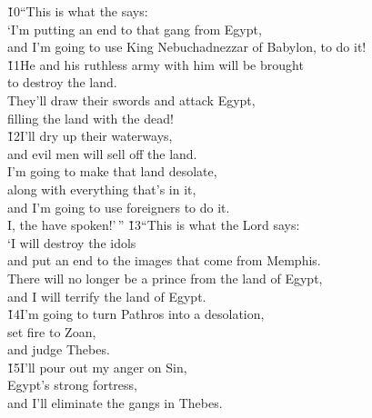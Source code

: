 \begin{poetry}
\poeml \v{10}``This is what the  says: \\
\poeml `I'm putting an end to that gang from Egypt, \\
\poemll    and I'm going to use King Nebuchadnezzar of Babylon, to do it! \\
\poeml \v{11}He and his ruthless army with him will be brought \\
\poemll    to destroy the land. \\
\poeml They'll draw their swords and attack Egypt, \\
\poemll    filling the land with the dead! \\
\poeml \v{12}I'll dry up their waterways, \\
\poemll    and evil men will sell off the land. \\
\poeml I'm going to make that land desolate, \\
\poemll    along with everything that's in it, \\
\poeml and I'm going to use foreigners to do it. \\
\poemll    I, the  have spoken!'\,''
\poeml \v{13}``This is what the Lord  says: \\
\poeml `I will destroy the idols \\
\poemll    and put an end to the images that come from Memphis. \\
\poeml There will no longer be a prince from the land of Egypt, \\
\poemll    and I will terrify the land of Egypt. \\
\poeml \v{14}I'm going to turn Pathros into a desolation, \\
\poemll    set fire to Zoan, \\
\poemlll       and judge Thebes. \\
\poeml \v{15}I'll pour out my anger on Sin, \\
\poemll    Egypt's strong fortress, \\
\poemlll       and I'll eliminate the gangs in Thebes. \\

\end{poetry}
